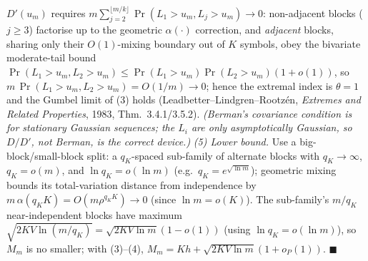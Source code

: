 \documentclass[
]{article}
\begin{document}
$D'(u_m)$ requires $m\sum_{j=2}^{\lfloor m/k\rfloor}\Pr(L_1>u_m,L_j>u_m)\to0$: non-adjacent
blocks ($j\ge3$) factorise up to the geometric $\alpha(\cdot)$ correction, and \emph{adjacent}
blocks, sharing only their $O(1)$-mixing boundary out of $K$ symbols, obey the bivariate
moderate-tail bound $\Pr(L_1>u_m,L_2>u_m)\le\Pr(L_1>u_m)\Pr(L_2>u_m)(1+o(1))$, so
$m\,\Pr(L_1>u_m,L_2>u_m)=O(1/m)\to0$; hence the extremal index is
$\theta=1$ and the Gumbel limit of (3) holds (Leadbetter--Lindgren--Rootz\'en,
\emph{Extremes and Related Properties}, 1983, Thm.~3.4.1/3.5.2). \emph{(Berman's covariance
condition is for stationary \emph{Gaussian} sequences; the $L_i$ are only asymptotically
Gaussian, so $D/D'$, not Berman, is the correct device.)} \emph{(5) Lower bound.} Use a
big-block/small-block split: a $q_K$-spaced sub-family of alternate blocks with
$q_K\to\infty$, $q_K=o(m)$, and $\ln q_K=o(\ln m)$ (e.g.\ $q_K=e^{\sqrt{\ln m}}$); geometric
mixing bounds its total-variation distance from independence by
$m\,\alpha(q_KK)=O(m\rho^{q_KK})\to0$ (since $\ln m=o(K)$). The sub-family's $m/q_K$
near-independent blocks have maximum $\sqrt{2KV\ln(m/q_K)}=\sqrt{2KV\ln m}(1-o(1))$ (using
$\ln q_K=o(\ln m)$), so $M_m$ is no smaller; with (3)--(4),
$M_m=Kh+\sqrt{2KV\ln m}(1+o_P(1))$. \hfill$\blacksquare$
\end{document}
